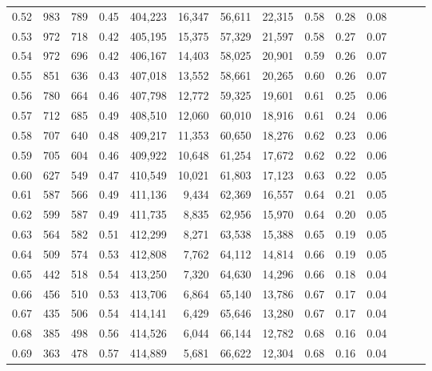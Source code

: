 \begin{tabular}{rrrrrrrrrrrrrr}
0.52 &     983 &    789 &  0.45 &  404,223 &   16,347 &  56,611 &  22,315 &  0.58 &  0.28 &      0.08 \\
0.53 &     972 &    718 &  0.42 &  405,195 &   15,375 &  57,329 &  21,597 &  0.58 &  0.27 &      0.07 \\
0.54 &     972 &    696 &  0.42 &  406,167 &   14,403 &  58,025 &  20,901 &  0.59 &  0.26 &      0.07 \\
0.55 &     851 &    636 &  0.43 &  407,018 &   13,552 &  58,661 &  20,265 &  0.60 &  0.26 &      0.07 \\
0.56 &     780 &    664 &  0.46 &  407,798 &   12,772 &  59,325 &  19,601 &  0.61 &  0.25 &      0.06 \\
0.57 &     712 &    685 &  0.49 &  408,510 &   12,060 &  60,010 &  18,916 &  0.61 &  0.24 &      0.06 \\
0.58 &     707 &    640 &  0.48 &  409,217 &   11,353 &  60,650 &  18,276 &  0.62 &  0.23 &      0.06 \\
0.59 &     705 &    604 &  0.46 &  409,922 &   10,648 &  61,254 &  17,672 &  0.62 &  0.22 &      0.06 \\
0.60 &     627 &    549 &  0.47 &  410,549 &   10,021 &  61,803 &  17,123 &  0.63 &  0.22 &      0.05 \\
0.61 &     587 &    566 &  0.49 &  411,136 &    9,434 &  62,369 &  16,557 &  0.64 &  0.21 &      0.05 \\
0.62 &     599 &    587 &  0.49 &  411,735 &    8,835 &  62,956 &  15,970 &  0.64 &  0.20 &      0.05 \\
0.63 &     564 &    582 &  0.51 &  412,299 &    8,271 &  63,538 &  15,388 &  0.65 &  0.19 &      0.05 \\
0.64 &     509 &    574 &  0.53 &  412,808 &    7,762 &  64,112 &  14,814 &  0.66 &  0.19 &      0.05 \\
0.65 &     442 &    518 &  0.54 &  413,250 &    7,320 &  64,630 &  14,296 &  0.66 &  0.18 &      0.04 \\
0.66 &     456 &    510 &  0.53 &  413,706 &    6,864 &  65,140 &  13,786 &  0.67 &  0.17 &      0.04 \\
0.67 &     435 &    506 &  0.54 &  414,141 &    6,429 &  65,646 &  13,280 &  0.67 &  0.17 &      0.04 \\
0.68 &     385 &    498 &  0.56 &  414,526 &    6,044 &  66,144 &  12,782 &  0.68 &  0.16 &      0.04 \\
0.69 &     363 &    478 &  0.57 &  414,889 &    5,681 &  66,622 &  12,304 &  0.68 &  0.16 &      0.04 \\

\end{tabular}
